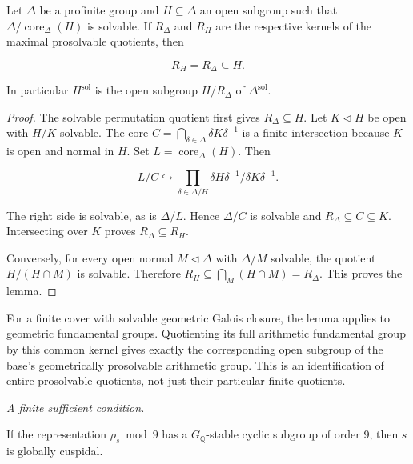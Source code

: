 \begin{lemma}\label{lem:solvable-open-topology} Let \(\Delta\) be a profinite group and
\(H\subseteq\Delta\) an open subgroup such that
\(\Delta/\operatorname{core}_\Delta(H)\) is solvable. If \(R_\Delta\)
and \(R_H\) are the respective kernels of the maximal prosolvable
quotients, then

\[
R_H=R_\Delta\subseteq H.
\]

In particular \(H^{\mathrm{sol}}\) is the open subgroup \(H/R_\Delta\)
of \(\Delta^{\mathrm{sol}}\).

\end{lemma}\begin{proof} The solvable permutation quotient first gives
\(R_\Delta\subseteq H\). Let \(K\triangleleft H\) be open with \(H/K\)
solvable. The core \(C=\bigcap_{\delta\in\Delta}\delta K\delta^{-1}\) is
a finite intersection because \(K\) is open and normal in \(H\). Set
\(L=\operatorname{core}_\Delta(H)\). Then

\[
L/C\hookrightarrow
\prod_{\delta\in\Delta/H}
 \delta H\delta^{-1}/\delta K\delta^{-1}.
\]

The right side is solvable, as is \(\Delta/L\). Hence \(\Delta/C\) is
solvable and \(R_\Delta\subseteq C\subseteq K\). Intersecting over \(K\)
proves \(R_\Delta\subseteq R_H\).

Conversely, for every open normal \(M\triangleleft\Delta\) with
\(\Delta/M\) solvable, the quotient \(H/(H\cap M)\) is solvable.
Therefore \(R_H\subseteq\bigcap_M(H\cap M)=R_\Delta\). This proves the
lemma.

\end{proof}

For a finite cover with solvable geometric Galois closure, the lemma
applies to geometric fundamental groups. Quotienting its full arithmetic
fundamental group by this common kernel gives exactly the corresponding
open subgroup of the base's geometrically prosolvable arithmetic group.
This is an identification of entire prosolvable quotients, not just
their particular finite quotients.

\par\medskip\noindent\textit{A finite sufficient condition.}\quad 

\begin{proposition}\label{prop:frey-three-mod-nine} If the representation \(\rho_s\bmod9\) has a
\(G_{\mathbb Q}\)-stable cyclic subgroup of order 9, then \(s\) is
globally cuspidal.
\end{proposition}


